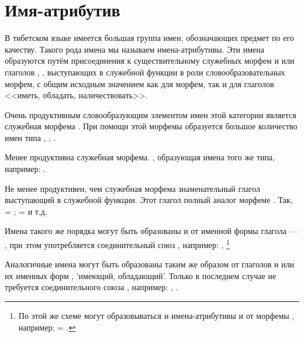 \section{Имя-атрибутив}

В тибетском языке имеется большая группа имен, обозначающих предмет по его качеству. Такого рода имена мы называем имена-атрибутивы. Эти имена образуются путём присоединения к существительному служебных морфем  и  или глаголов , ,  выступающих в служебной функции в роли словообразовательных морфем, с общим исходным значением
как для морфем, так и для глаголов <<иметь, обладать, наличествовать>>.

Очень продуктивным словообразующим элементом имен этой категории является служебная морфема	. При помощи этой морфемы образуется большое количество имен типа , , .

Менее продуктивна служебная морфема. , образующая имена того же типа, например: .

Не менее продуктивен, чем служебная морфема  знаменательный глагол  выступающий в служебной функции. Этот глагол полный аналог морфеме . Так,  = ;
 =  и т.д.

Имена такого же порядка могут быть образованы и от именной формы глагола  --- ,
при этом употребляется соединительный союз , например:
, \footnote[31]{
    По этой же схеме могут образовываться и имена-атрибутивы и от морфемы , например:
     = .
}

Аналогичные имена могут быть образованы таким же образом от глаголов  и  или их именных форм ,  'имеющий, обладающий'. Только в последнем случае не требуется соединительного союза , например:
, .

